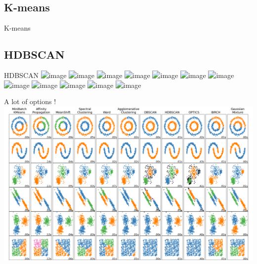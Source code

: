 \documentclass{irdbeamer}
\begin{document}
\subsection{K-means}
\begin{frame}{K-means}
    
\end{frame}

\subsection{HDBSCAN}
\begin{frame}{HDBSCAN}
    \centering
    \includegraphics<1>[width=.7\textwidth]{./figs/hdbscan/1.png}%
    \includegraphics<2>[width=.7\textwidth]{./figs/hdbscan/2.png}%
    \includegraphics<3>[width=.7\textwidth]{./figs/hdbscan/3.png}%
    \includegraphics<4>[width=.7\textwidth]{./figs/hdbscan/4.png}%
    \includegraphics<5>[width=.7\textwidth]{./figs/hdbscan/5.png}%
    \includegraphics<6>[width=.7\textwidth]{./figs/hdbscan/6.png}%
    \includegraphics<7>[width=.7\textwidth]{./figs/hdbscan/7.png}%
    \includegraphics<8>[width=.7\textwidth]{./figs/hdbscan/8.png}%
    \includegraphics<9>[width=.7\textwidth]{./figs/hdbscan/9.png}%
    \includegraphics<10>[width=.7\textwidth]{./figs/hdbscan/10.png}%
    \includegraphics<11>[width=.7\textwidth]{./figs/hdbscan/11.png}%
    \includegraphics<12>[width=.7\textwidth]{./figs/hdbscan/12.png}%
\end{frame}

\begin{frame}{A lot of options !}
    \centering
    \vspace{-1cm}
    \includegraphics[width=.9\textwidth]{./figs/all_clusterings.png}
\end{frame}
\end{document}
